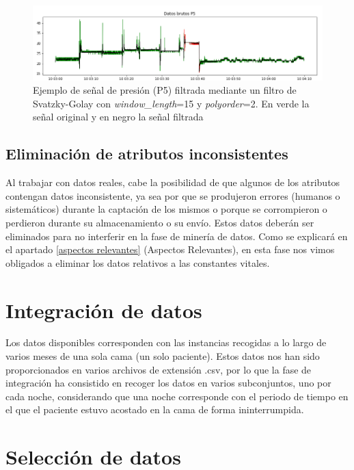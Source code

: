 \begin{itemize}
	\begin{figure}[H]
		\centering
		\includegraphics[width=1\textwidth]{../img/senalP5savgol.png}
		\caption[Señal de presión (P5) filtrada con Svatzky-Golay.]{Ejemplo de señal de presión (P5) filtrada mediante un filtro de Svatzky-Golay con \textit{window\_length}=15 y \textit{polyorder}=2. En verde la señal original y en negro la señal filtrada}
		\label{fig:senalP5savgol}
	\end{figure}
\end{itemize}

\subsection{Eliminación de atributos inconsistentes}

Al trabajar con datos reales, cabe la posibilidad de que algunos de los atributos contengan datos inconsistente, ya sea por que se produjeron errores (humanos o sistemáticos) durante la captación de los mismos o porque se corrompieron o perdieron durante su almacenamiento o su envío. Estos datos deberán ser eliminados para no interferir en la fase de minería de datos. Como se explicará en el apartado \ref{aspectos relevantes} (Aspectos Relevantes), en esta fase nos vimos obligados a eliminar los datos relativos a las constantes vitales. 

\section{Integración de datos}

Los datos disponibles corresponden con las instancias recogidas a lo largo de varios meses de una sola cama (un solo paciente). Estos datos nos han sido proporcionados en varios archivos de extensión .csv, por lo que la fase de integración ha consistido en recoger los datos en varios subconjuntos, uno por cada noche, considerando que una noche corresponde con el periodo de tiempo en el que el paciente estuvo acostado en la cama de forma ininterrumpida. 

\section{Selección de datos}

